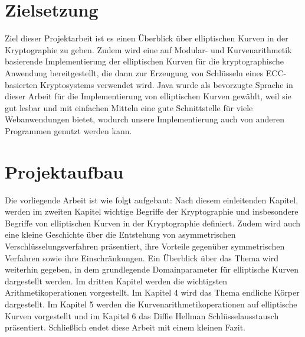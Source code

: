 \section{Zielsetzung}

Ziel dieser Projektarbeit ist es einen Überblick über elliptischen Kurven in der Kryptographie zu geben. 
Zudem wird eine auf Modular- und Kurvenarithmetik basierende Implementierung der elliptischen Kurven für die kryptographische Anwendung bereitgestellt, die dann zur  Erzeugung von Schlüsseln eines ECC-basierten Kryptosystems verwendet wird.
Java wurde als bevorzugte Sprache in dieser Arbeit für die Implementierung von elliptischen Kurven gewählt, weil sie gut lesbar und mit einfachen Mitteln eine gute Schnittstelle für viele Webanwendungen bietet, wodurch unsere Implementierung auch von anderen Programmen genutzt werden kann.

\section{Projektaufbau}


Die vorliegende Arbeit ist wie folgt aufgebaut: Nach diesem einleitenden Kapitel, werden im zweiten Kapitel wichtige Begriffe der Kryptographie und insbesondere Begriffe von elliptischen Kurven in der Kryptographie definiert. Zudem wird auch eine kleine Geschichte über die Entstehung von asymmetrischen Verschlüsselungsverfahren präsentiert, ihre Vorteile gegenüber symmetrischen Verfahren sowie ihre Einschränkungen. Ein Überblick über das Thema wird weiterhin gegeben, in dem grundlegende Domainparameter für elliptische Kurven dargestellt werden. Im dritten Kapitel werden die wichtigsten Arithmetikoperationen vorgestellt. Im Kapitel 4 wird das Thema endliche Körper dargestellt. Im Kapitel 5 werden die Kurvenarithmetikoperationen auf elliptische Kurven vorgestellt und im Kapitel 6 das Diffie Hellman Schlüsselausstausch präsentiert. Schließlich endet diese Arbeit mit einem kleinen Fazit. 
